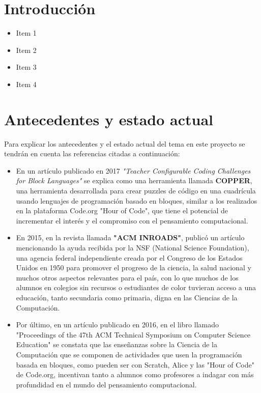 
\section{Introducción}
\label{1:sec:1}

\begin{itemize}
  \item Item 1 \cite{Bay1}
  \item Item 2
  \item Item 3
  \item Item 4
\end{itemize}

\section{Antecedentes y estado actual}
\label{1:sec:2}

Para explicar los antecedentes y el estado actual del tema en este proyecto se tendrán en cuenta las referencias citadas a continuación:

\begin{itemize}
  \item En un artículo publicado en 2017 \textit{"Teacher Configurable Coding Challenges for Block Languages"} se explica como una herramienta llamada \textbf{COPPER}\cite{Tumlin:2017:TCC:3017680.3022467}, una herramienta desarrollada para crear puzzles de código en una cuadrícula usando lenguajes de programación basado en bloques, similar a los realizados en la plataforma Code.org "Hour of Code", que tiene el potencial de incrementar el interés y el compromiso con el pensamiento computacional.
  \item En 2015, en la revista llamada \textbf{"ACM INROADS"}, publicó un artículo\cite{Wilson:2015:HCB:2786608.2746406} mencionando la ayuda recibida por la NSF (National Science Foundation), una agencia federal independiente creada por el Congreso de los Estados Unidos en 1950 para promover el progreso de la ciencia, la salud nacional y muchos otros aspectos relevantes para el país, con lo que muchos de los alumnos en colegios sin recursos o estudiantes de color tuvieran acceso a una educación, tanto secundaria como primaria, digna en las Ciencias de la Computación.
  \item Por último, en un artículo\cite{Brown:2016:PFD:2839509.2844661} publicado en 2016, en el libro llamado "Proceedings of the 47th ACM Technical Symposium on Computer Science Education"  se constata que las enseñanzas sobre la Ciencia de la Computación que se componen de actividades que usen la programación basada en bloques, como pueden ser con Scratch, Alice y las "Hour of Code" de Code.org, incentivan tanto a alumnos como profesores a indagar con más profundidad en el mundo del pensamiento computacional.

\end{itemize}

